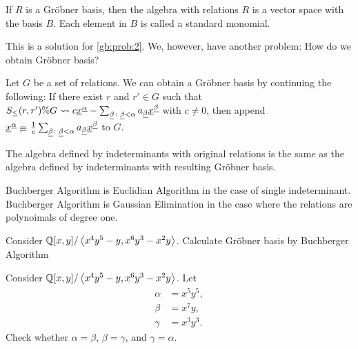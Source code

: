 \begin{remark}
  If $R$ is a Gr\"obner basis,
  then
  the algebra with relations $R$ is a vector space with the basis $B$.
  Each element in $B$ is called a standard monomial.
\end{remark}

This is a solution for \cref{gb:prob:2}.
We, however, have another problem:
How do we obtain Gr\"obner basis?


\begin{theorem}
  Let $G$ be a set of relations.
  We can obtain a Gr\"obner basis by continuing the following:
  If there exist $r$ and $r' \in G$
  such that $S_{\leq}(r,r')\%G\leadsto c{\underline{x}}^{\underline{\alpha}}-\sum_{{\underline{\beta}}\colon {\underline{\beta}}<\alpha} a_{\underline{\beta}} {\underline{x}}^{\underline{\beta}}$ with $c\neq 0$,
  then append $\xxx^\aaalpha\denotes \frac{1}{c}\sum_{\bbbeta\colon \bbbeta<\alpha} a_\bbbeta \xxx^\bbbeta$
  to $G$.

  The algebra defined by indeterminants with original relations
  is the same as the algebra defined by indeterminants with resulting Gr\"obner basis.
\end{theorem}

\begin{remark}
  Buchberger Algorithm is Euclidian Algorithm  in the case of single indeterminant.
  Buchberger Algorithm is Gaussian Elimination
  in the case where the relations are polynoimals of degree one.
\end{remark}

\begin{example}
  Consider $\mathbb{Q}[x,y]/\Braket{x^4y^5-y,x^6y^3-x^2y}$.
  Calculate Gr\"obner basis by Buchberger Algorithm
\end{example}

\begin{quiz}
  Consider $\mathbb{Q}[x,y]/\Braket{x^4y^5-y,x^6y^3-x^2y}$.
  Let
  \begin{align*}
    \alpha &= x^5y^5,\\
    \beta &= x^7y,\\
    \gamma &= x^3y^3.
  \end{align*}
  Check whether $\alpha=\beta$, $\beta=\gamma$,
  and $\gamma=\alpha$.
\end{quiz}
